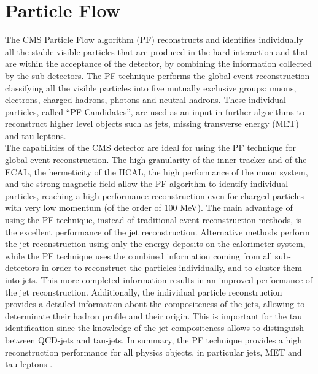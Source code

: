 
\section{Particle Flow}
\label{sec:PF}

\noindent The CMS Particle Flow algorithm (PF) reconstructs and identifies 
individually all the stable visible particles that are produced in the hard interaction
and that are within the acceptance of the detector, by combining the 
information collected by the sub-detectors. The PF technique performs the global event 
reconstruction classifying all the visible particles into five mutually exclusive groups: 
muons, electrons, charged hadrons, photons and neutral hadrons. These individual particles, called 
``PF Candidates'', are used as an input in further algorithms to reconstruct higher 
level objects such as jets, missing transverse energy (MET) and tau-leptons. \\

\noindent The capabilities of the CMS detector are ideal for using the PF technique 
for global event reconstruction. The high granularity of the inner tracker 
and of the ECAL, the hermeticity of the HCAL, the high performance of the muon
system, and the strong magnetic field allow the PF algorithm to identify individual 
particles, reaching a high performance reconstruction even for charged particles 
with very low momentum (of the order of 100 MeV). The main advantage of using the PF 
technique, instead of traditional event reconstruction methods, is the excellent 
performance of the jet reconstruction. Alternative methods perform the jet 
reconstruction using only the energy deposits on the calorimeter system, while 
the PF technique uses the combined information coming from all sub-detectors 
in order to reconstruct the particles individually, and to cluster them into jets. This 
more completed information results in an improved performance of the jet 
reconstruction. Additionally, the individual particle reconstruction
provides a detailed information about the compositeness of the jets, allowing 
to determinate their hadron profile and their origin. This is important 
for the tau identification since the knowledge of the jet-compositeness allows to 
distinguish between QCD-jets and tau-jets. In summary, the PF technique provides a high
reconstruction performance for all physics objects, in particular jets, MET and 
tau-leptons \cite{PFAlgorithm}.\\

